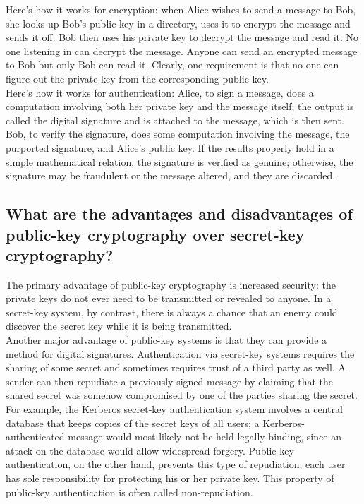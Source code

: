 Here's how it works for encryption: when Alice wishes to send a message
to Bob, she looks up Bob's public key in a directory, uses it to
encrypt the message and sends it off. Bob then uses his private key to
decrypt the message and read it. No one listening in can decrypt the
message. Anyone can send an encrypted message to Bob but only Bob can
read it. Clearly, one requirement is that no one can figure out the
private key from the corresponding public key.\\

Here's how it works for authentication: Alice, to sign a message, does
a computation involving both her private key and the message itself;
the output is called the digital signature and is attached to the
message, which is then sent. Bob, to verify the signature, does some
computation involving the message, the purported signature, and Alice's
public key. If the results properly hold in a simple mathematical
relation, the signature is verified as genuine; otherwise, the
signature may be fraudulent or the message altered, and they are
discarded.


\subsection{What are the advantages and disadvantages of public-key
cryptography over secret-key cryptography?}
\label{what_adv_pkc}

The primary advantage of public-key cryptography is increased security:
the private keys do not ever need to be transmitted or revealed to
anyone. In a secret-key system, by contrast, there is always a chance
that an enemy could discover the secret key while it is being
transmitted.\\

Another major advantage of public-key systems is that they can provide
a method for digital signatures. Authentication via secret-key systems
requires the sharing of some secret and sometimes requires trust of a
third party as well. A sender can then repudiate a previously signed
message by claiming that the shared secret was somehow compromised by
one of the parties sharing the secret. For example, the Kerberos
secret-key authentication system involves a central database that keeps
copies of the secret keys of all users; a Kerberos-authenticated
message would most likely not be held legally binding, since an attack
on the database would allow widespread forgery. Public-key
authentication, on the other hand, prevents this type of repudiation;
each user has sole responsibility for protecting his or her private
key. This property of public-key authentication is often called
non-repudiation.\\

